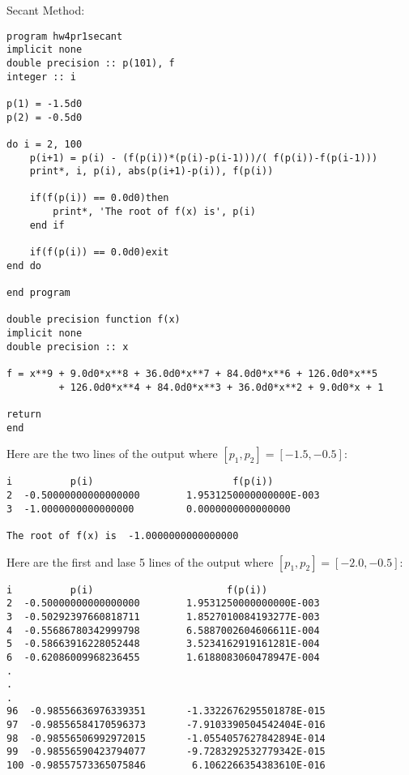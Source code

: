 \documentclass[12pt]{article}
\begin{document}
\bigskip
\noindent Secant Method:
\begin{verbatim}
program hw4pr1secant
implicit none
double precision :: p(101), f
integer :: i 

p(1) = -1.5d0
p(2) = -0.5d0

do i = 2, 100
	p(i+1) = p(i) - (f(p(i))*(p(i)-p(i-1)))/( f(p(i))-f(p(i-1)))
	print*, i, p(i), abs(p(i+1)-p(i)), f(p(i))
	
	if(f(p(i)) == 0.0d0)then
		print*, 'The root of f(x) is', p(i)
	end if
	
	if(f(p(i)) == 0.0d0)exit
end do 

end program

double precision function f(x)
implicit none
double precision :: x

f = x**9 + 9.0d0*x**8 + 36.0d0*x**7 + 84.0d0*x**6 + 126.0d0*x**5
         + 126.0d0*x**4 + 84.0d0*x**3 + 36.0d0*x**2 + 9.0d0*x + 1

return
end
\end{verbatim}

\bigskip
\noindent Here are the two lines of the output where $[p_1, p_2]=[-1.5, -0.5]$:
\begin{verbatim}
i          p(i)                        f(p(i))
2  -0.50000000000000000        1.9531250000000000E-003
3  -1.0000000000000000         0.0000000000000000

The root of f(x) is  -1.0000000000000000
\end{verbatim}

\bigskip
\noindent Here are the first and lase 5 lines of the output where $[p_1, p_2]=[-2.0, -0.5]$:
\begin{verbatim}
i          p(i)                       f(p(i))
2  -0.50000000000000000        1.9531250000000000E-003
3  -0.50292397660818711        1.8527010084193277E-003
4  -0.55686780342999798        6.5887002604606611E-004
5  -0.58663916228052448        3.5234162919161281E-004
6  -0.62086009968236455        1.6188083060478947E-004
.
.
.
96  -0.98556636976339351       -1.3322676295501878E-015
97  -0.98556584170596373       -7.9103390504542404E-016
98  -0.98556506992972015       -1.0554057627842894E-014
99  -0.98556590423794077       -9.7283292532779342E-015
100 -0.98557573365075846        6.1062266354383610E-016
\end{verbatim}
\end{document}
